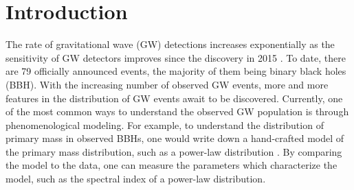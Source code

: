 \documentclass[nohyperref]{article}
\theoremstyle{plain}
\theoremstyle{definition}
\theoremstyle{remark}
\begin{document}
\section{Introduction}
The rate of gravitational wave (GW) detections increases exponentially as the sensitivity of GW detectors improves \cite{LIGOScientific:2021djp} since the discovery in 2015 \cite{Abbott:2016blz}.
To date, there are 79 officially announced events, the majority of them being binary black holes (BBH).
With the increasing number of observed GW events, more and more features in the distribution of GW events await to be discovered.
Currently, one of the most common ways to understand the observed GW population is through phenomenological modeling.
For example, to understand the distribution of primary mass in observed BBHs, one would write down a hand-crafted model of the primary mass distribution, such as a power-law distribution \cite{LIGOScientific:2021psn}.
By comparing the model to the data, one can measure the parameters which characterize the model, such as the spectral index of a power-law distribution.
\end{document}
